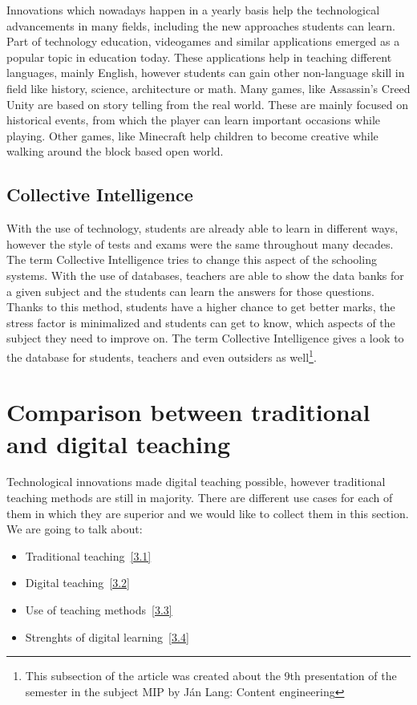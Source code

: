 \documentclass[10pt,oneside,english,a4paper]{article}
\begin{document}
	Innovations which nowadays happen in a yearly basis  help the technological advancements in many fields, including the new approaches students can learn. Part of technology education, videogames and similar applications emerged as a popular topic
in education today\cite{Okur2017}. These applications help in teaching different languages, mainly English, however students can gain other non-language skill in field like history, science, architecture or math. Many games, like Assassin's Creed Unity are based on story telling from the real world. These are mainly focused on historical events, from which the player can learn important occasions while playing. Other games, like Minecraft help children to become creative while walking around the block based open world. 

\subsection{Collective Intelligence}

	With the use of technology, students are already able to learn in different ways, however the style of tests and exams were the same throughout many decades. The term Collective Intelligence tries to change this aspect of the schooling systems. With the use of databases, teachers are able to show the data banks for a given subject and the students can learn the answers for those questions. Thanks to this method, students have a higher chance to get better marks, the stress factor is minimalized and students can  get to know, which aspects of the subject they need to improve on. The term Collective Intelligence gives a look to the database for students, teachers and even outsiders as well\footnote{This subsection of the article was created about the 9th presentation of the semester in the subject MIP by Ján Lang: Content engineering}.

\section{Comparison between traditional and digital teaching}\label{comparison}

	Technological innovations made digital teaching possible, however traditional teaching methods are still in majority. There are different use cases for each of them in which they are superior and we would like to collect them in this section. We are going to talk about:

\begin{itemize}
\item Traditional teaching~\ref{3.1}
\item Digital teaching~\ref{3.2}
\item Use of teaching methods~\ref{3.3}
\item Strenghts of digital learning~\ref{3.4}
\end{itemize}
\end{document}

